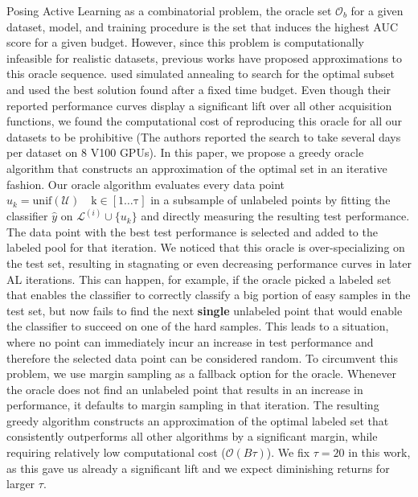 \documentclass[]{article}
\begin{document}
Posing Active Learning as a combinatorial problem, the oracle set $\mathcal{O}_b$ for a given dataset, model, and training procedure is the set that induces the highest AUC score for a given budget.
However, since this problem is computationally infeasible for realistic datasets, previous works have proposed approximations to this oracle sequence. 
\cite{zhou2021towards} used simulated annealing to search for the optimal subset and used the best  solution found after a fixed time budget. 
Even though their reported performance curves display a significant lift over all other acquisition functions, we found the computational cost of reproducing this oracle for all our datasets to be prohibitive (The authors reported the search to take several days per dataset on 8 V100 GPUs).
In this paper, we propose a greedy oracle algorithm that constructs an approximation of the optimal set in an iterative fashion.
Our oracle algorithm evaluates every data point $u_k = \operatorname{unif(\mathcal{U}) \quad k \in [1 \ldots \tau]}$ in a subsample of unlabeled points by fitting the classifier $\hat y$ on $\mathcal{L}^{(i)} \cup \{u_k\}$ and directly measuring the resulting test performance.
The data point with the best test performance is selected and added to the labeled pool for that iteration.
We noticed that this oracle is over-specializing on the test set, resulting in stagnating or even decreasing performance curves in later AL iterations.
This can happen, for example, if the oracle picked a labeled set that enables the classifier to correctly classify a big portion of easy samples in the test set, but now fails to find the next \textbf{single} unlabeled point that would enable the classifier to succeed on one of the hard samples.
This leads to a situation, where no point can immediately incur an increase in test performance and therefore the selected data point can be considered random.
To circumvent this problem, we use margin sampling \cite{wang2014new} as a fallback option for the oracle.
Whenever the oracle does not find an unlabeled point that results in an increase in performance, it defaults to margin sampling in that iteration.
The resulting greedy algorithm constructs an approximation of the optimal labeled set that consistently outperforms all other algorithms by a significant margin, while requiring relatively low computational cost ($\mathcal{O}(B\tau)$).
We fix $\tau = 20$ in this work, as this gave us already a significant lift and we expect diminishing returns for larger $\tau$.
\end{document}
